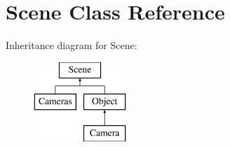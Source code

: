 \hypertarget{class_scene}{\section{Scene Class Reference}
\label{class_scene}
}
Inheritance diagram for Scene\-:\begin{figure}[H]
\begin{center}
\leavevmode
\includegraphics[height=3.000000cm]{class_scene}
\end{center}
\end{figure}
